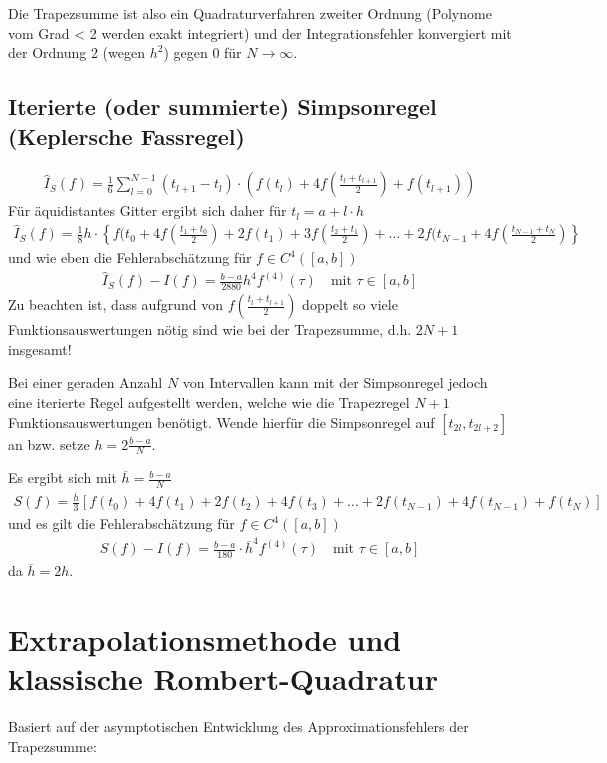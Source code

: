 \documentclass[ngerman,fontsize=11pt, paper=a4, parskip=half, titlepage=true, toc=bib]{scrbook}
\theoremstyle{definition}
\theoremstyle{plain}
\newcommand{\sectione}[1]{ \setcounter{equation}{0}\section{#1}}
\newcommand{\subsectione}[1]{\addtocounter{Def}{1}\subsection{#1}}
\begin{document}
Die Trapezsumme ist also ein
Quadraturverfahren zweiter Ordnung
(Polynome vom Grad < 2 werden exakt integriert) und der
Integrationsfehler konvergiert mit der Ordnung 2 (wegen $h^2$) gegen 0
für $N\longrightarrow \infty$.

\subsectione{Iterierte (oder
  summierte) Simpsonregel
  (Keplersche Fassregel)}
\begin{gather}
  \hat{I}_S(f) = \frac{1}{6}\sum_{l=0}^{N-1} (t_{l+1}-t_l)
  \cdot \left(f(t_l) +4f(\frac{t_l+t_{l+1}}{2}) + f(t_{l+1})
    \right)
\label{VII.2.13}
\end{gather}
Für äquidistantes Gitter ergibt sich daher für $t_l=a+l\cdot h$
\begin{gather}
  \hat{I}_S(f) = \frac{1}{8}h\cdot
  \left\{
  f(t_0+4f\left(\frac{t_1+t_0}{2}\right) 
  +2f(t_1) + 3f\left(\frac{t_2+t_1}{2}\right)
  + \ldots +2f(t_{N-1}
  +4f\left(\frac{t_{N-1}+t_N}{2}\right)
\right\}
\label{VII.2.14}
\end{gather}
und wie eben die Fehlerabschätzung
für $f\in C^4([a,b])$
\begin{gather}
  \hat{I}_S(f) -I(f) =
  \frac{b-a}{2880}h^4f^{(4)}(\tau)
  \quad \text{mit } \tau\in[a,b]
\label{VII.2.15}
\end{gather}
Zu beachten ist, dass aufgrund von
$f\left(\frac{t_l+t_{l+1}}{2}\right)$
doppelt so viele Funktionsauswertungen nötig sind
wie bei der Trapezsumme, d.h. $2N+1$ insgesamt!

Bei einer geraden Anzahl $N$ von Intervallen kann mit der
Simpsonregel jedoch eine iterierte Regel aufgestellt werden,
 welche wie die Trapezregel $N+1$ Funktionsauswertungen benötigt.
Wende hierfür die Simpsonregel auf $[t_{2l}, t_{2l+2}]$ an
bzw. setze $h=2\frac{b-a}{N}$.

Es ergibt sich mit $\overline{h}= \frac{b-a}{N}$
\begin{gather}
S(f) = \frac{\overline{h}}{3}\left[
       f(t_0)+4f(t_1) + 2f(t_2) + 4f(t_3) +
     \ldots + 2f(t_{N-1}) + 4f(t_{N-1}) + f(t_N)
       \right]
  \label{VII.2.16}
\end{gather}
und es gilt die Fehlerabschätzung für $f\in C^4([a,b])$
\begin{gather}
  S(f)-I(f)=
  \frac{b-a}{180}\cdot\overline{h}^4f^{(4)}(\tau)
\quad \text{mit } \tau \in[a,b]
\label{VII.2.17}
\end{gather}
da $\overline{h}= 2h$.


\sectione{Extrapolationsmethode und
  klassische Rombert-Quadratur}
Basiert auf der asymptotischen
Entwicklung
des Approximationsfehlers der
Trapezsumme:
\end{document}
